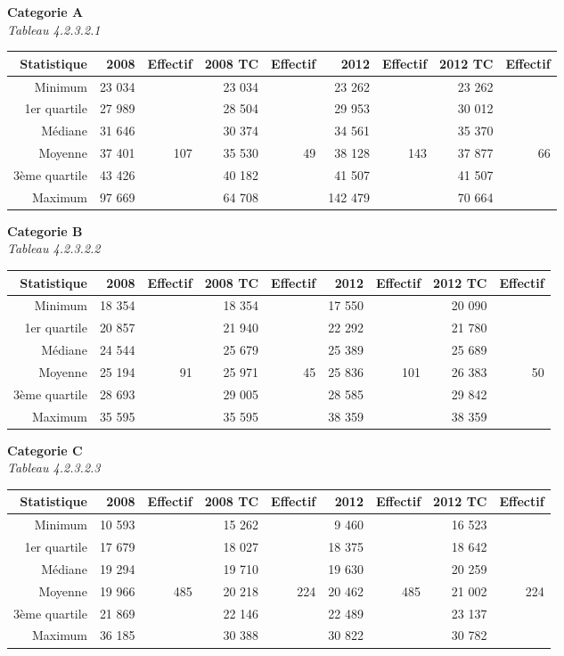 \textbf{Categorie A}\\
\hspace*{0.333em}\emph{Tableau 4.2.3.2.1}

\begin{longtable}[]{@{}rrrrrrrrr@{}}
\toprule
Statistique & 2008 & Effectif & 2008 TC & Effectif & 2012 & Effectif &
2012 TC & Effectif\tabularnewline
\midrule
\endhead
Minimum & 23 034 & & 23 034 & & 23 262 & & 23 262 &\tabularnewline
1er quartile & 27 989 & & 28 504 & & 29 953 & & 30 012 &\tabularnewline
Médiane & 31 646 & & 30 374 & & 34 561 & & 35 370 &\tabularnewline
Moyenne & 37 401 & 107 & 35 530 & 49 & 38 128 & 143 & 37 877 &
66\tabularnewline
3ème quartile & 43 426 & & 40 182 & & 41 507 & & 41 507 &\tabularnewline
Maximum & 97 669 & & 64 708 & & 142 479 & & 70 664 &\tabularnewline
\bottomrule
\end{longtable}

\textbf{Categorie B}\\
\hspace*{0.333em}\emph{Tableau 4.2.3.2.2}

\begin{longtable}[]{@{}rrrrrrrrr@{}}
\toprule
Statistique & 2008 & Effectif & 2008 TC & Effectif & 2012 & Effectif &
2012 TC & Effectif\tabularnewline
\midrule
\endhead
Minimum & 18 354 & & 18 354 & & 17 550 & & 20 090 &\tabularnewline
1er quartile & 20 857 & & 21 940 & & 22 292 & & 21 780 &\tabularnewline
Médiane & 24 544 & & 25 679 & & 25 389 & & 25 689 &\tabularnewline
Moyenne & 25 194 & 91 & 25 971 & 45 & 25 836 & 101 & 26 383 &
50\tabularnewline
3ème quartile & 28 693 & & 29 005 & & 28 585 & & 29 842 &\tabularnewline
Maximum & 35 595 & & 35 595 & & 38 359 & & 38 359 &\tabularnewline
\bottomrule
\end{longtable}

\textbf{Categorie C}\\
\hspace*{0.333em}\emph{Tableau 4.2.3.2.3}

\begin{longtable}[]{@{}rrrrrrrrr@{}}
\toprule
Statistique & 2008 & Effectif & 2008 TC & Effectif & 2012 & Effectif &
2012 TC & Effectif\tabularnewline
\midrule
\endhead
Minimum & 10 593 & & 15 262 & & 9 460 & & 16 523 &\tabularnewline
1er quartile & 17 679 & & 18 027 & & 18 375 & & 18 642 &\tabularnewline
Médiane & 19 294 & & 19 710 & & 19 630 & & 20 259 &\tabularnewline
Moyenne & 19 966 & 485 & 20 218 & 224 & 20 462 & 485 & 21 002 &
224\tabularnewline
3ème quartile & 21 869 & & 22 146 & & 22 489 & & 23 137 &\tabularnewline
Maximum & 36 185 & & 30 388 & & 30 822 & & 30 782 &\tabularnewline
\bottomrule
\end{longtable}

